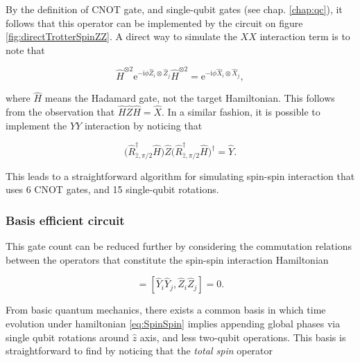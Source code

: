       By the definition of CNOT gate, and single-qubit gates (see chap. \ref{chap:qc}), it follows that this operator can be implemented by the circuit on figure \ref{fig:directTrotterSpinZZ}. A direct way to simulate the $XX$ interaction term is to note that

      \begin{equation}
        \hat{H}^{\otimes 2} \mathrm{e}^{-\mathrm{i}\phi \hat{Z}_i \otimes \hat{Z}_j} \hat{H}^{\otimes 2} = \mathrm{e}^{-\mathrm{i}\phi \hat{X}_i \otimes \hat{X}_j},
        \label{eq:Z2X}
      \end{equation}

      \noindent where $\hat{H}$ means the Hadamard gate, not the target Hamiltonian. This follows from the observation that $\hat{H}\hat{Z}\hat{H} = \hat{X}$. In a similar fashion, it is possible to implement the $YY$ interaction by noticing that

      \begin{equation}
        \Big(\hat{R}_{\hat{z}, \pi/2}^{\dagger}\hat{H}\Big)\hat{Z}\Big(\hat{R}_{\hat{z}, \pi/2}^{\dagger}\hat{H}\Big)^{\dagger} = \hat{Y}.
        \label{eq:Z2Y}
      \end{equation}

      

      This leads to a straightforward algorithm for simulating spin-spin interaction that uses 6 CNOT gates, and 15 single-qubit rotations. 
    
    \subsubsection{Basis efficient circuit}
    \label{subsubsec:BasisEfficientCircuit}

      This gate count can be reduced further by considering the commutation relations between the operators that constitute the spin-spin interaction Hamiltonian

      \begin{equation}
        [\hat{X}_i\hat{X}_j, \hat{Z}_i\hat{Z}_j] = [\hat{Y}_i\hat{Y}_j, \hat{Z}_i\hat{Z}_j] = 0.
        \label{eq:CommutationRelations}
      \end{equation}

      From basic quantum mechanics, there exists a common basis in which time evolution under hamiltonian \ref{eq:SpinSpin} implies appending global phases via single qubit rotations around $\hat{z}$ axis, and less two-qubit operations. This basis is straightforward to find by noticing that the \textit{total spin} operator

